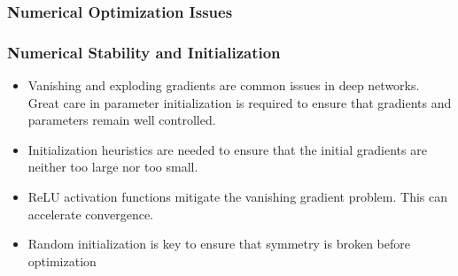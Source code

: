 \documentclass[
  shownotes,
  xcolor={svgnames},
  hyperref={colorlinks,citecolor=DarkBlue,linkcolor=DarkRed,urlcolor=DarkBlue}
  , aspectratio=169]{beamer}
\begin{document}
\subsubsection{Numerical Optimization Issues}
\begin{frame}
\frametitle{Numerical Stability and Initialization}

\begin{itemize}
\item Vanishing and exploding gradients are common issues in deep networks. Great care in parameter initialization is required to ensure that gradients and parameters remain well controlled.
\medskip
\item Initialization heuristics are needed to ensure that the initial gradients are neither too large nor too small.
\medskip
\item ReLU activation functions mitigate the vanishing gradient problem. This can accelerate convergence.
\medskip
\item Random initialization is key to ensure that symmetry is broken before optimization
\end{itemize}

\end{frame}
\end{document}
